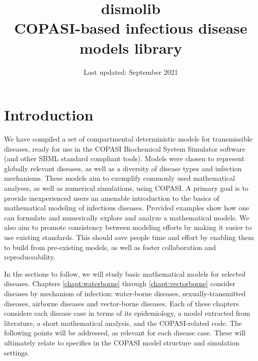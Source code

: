 \documentclass{book}
\title{\textbf{dismolib}\\
COPASI-based infectious disease models library}
\author{}
\date{Last updated: September 2021}
\begin{document}
\maketitle

\tableofcontents

\chapter{Introduction}
\label{chapt:intro}


We have compiled a set of compartmental deterministic models for transmissible diseases, ready for use in the COPASI Biochemical System Simulator software (and other SBML standard compliant tools). Models were chosen to represent globally relevant diseases, as well as a diversity of disease types and infection mechanisms. These models aim to exemplify commonly used mathematical analyses, as well as numerical simulations, using COPASI. A primary goal is to provide inexperienced users an amenable introduction to the basics of mathematical modeling of infectious diseases. Provided examples show how one can formulate and numerically explore and analyze a mathematical models. We also aim to promote consistency between modeling efforts by making it easier to use existing standards. This should save people time and effort by enabling them to build from pre-existing models, as well as foster collaboration and reproduceability.

In the sections to follow, we will study basic mathematical models for selected diseases. Chapters \ref{chapt:waterborne} through \ref{chapt:vectorborne} consider diseases by mechanism of infection: water-borne diseases, sexually-transmitted diseases, airborne diseases and vector-borne diseases. Each of these chapters considers each disease case in terms of its epidemiology, a model extracted from literature, a short mathematical analysis, and the COPASI-related code. The following points will be addressed, as relevant for each disease case. These will ultimately relate to specifics in the COPASI model structure and simulation settings.
\end{document}
